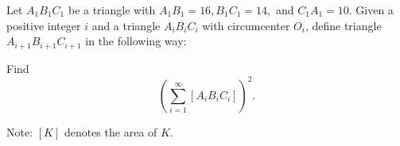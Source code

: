 Let $A_1B_1C_1$ be a triangle with $A_1B_1 = 16, B_1C_1 = 14,$ and $C_1A_1 = 10$. Given a positive integer $i$ and a triangle $A_iB_iC_i$ with circumcenter $O_i$, define triangle $A_{i+1}B_{i+1}C_{i+1}$ in the following way:

\begin{enumerate}
\end{enumerate}

Find \[ \left(\sum_{i = 1}^\infty [A_iB_iC_i] \right)^2. \]

Note: $[K]$ denotes the area of $K$.
